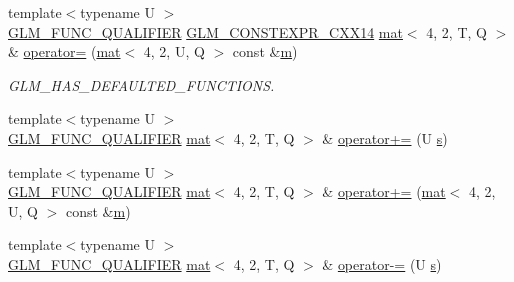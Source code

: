 \begin{DoxyCompactItemize}
\item 
{\footnotesize template$<$typename U $>$ }\\\mbox{\hyperlink{setup_8hpp_a33fdea6f91c5f834105f7415e2a64407}{G\+L\+M\+\_\+\+F\+U\+N\+C\+\_\+\+Q\+U\+A\+L\+I\+F\+I\+ER}} \mbox{\hyperlink{setup_8hpp_a4dd12abf5e1164bc57f3a34671d03844}{G\+L\+M\+\_\+\+C\+O\+N\+S\+T\+E\+X\+P\+R\+\_\+\+C\+X\+X14}} \mbox{\hyperlink{structglm_1_1mat}{mat}}$<$ 4, 2, T, Q $>$ \& \mbox{\hyperlink{structglm_1_1mat_3_014_00_012_00_01_t_00_01_q_01_4_a5a19a58d4bc0772518b210e63aa86e7f}{operator=}} (\mbox{\hyperlink{structglm_1_1mat}{mat}}$<$ 4, 2, U, Q $>$ const \&\mbox{\hyperlink{_s_d_l__opengl__glext_8h_af593500c283bf1a787a6f947f503a5c2}{m}})
\begin{DoxyCompactList}\small\item\em G\+L\+M\+\_\+\+H\+A\+S\+\_\+\+D\+E\+F\+A\+U\+L\+T\+E\+D\+\_\+\+F\+U\+N\+C\+T\+I\+O\+NS. \end{DoxyCompactList}\item 
{\footnotesize template$<$typename U $>$ }\\\mbox{\hyperlink{setup_8hpp_a33fdea6f91c5f834105f7415e2a64407}{G\+L\+M\+\_\+\+F\+U\+N\+C\+\_\+\+Q\+U\+A\+L\+I\+F\+I\+ER}} \mbox{\hyperlink{structglm_1_1mat}{mat}}$<$ 4, 2, T, Q $>$ \& \mbox{\hyperlink{structglm_1_1mat_3_014_00_012_00_01_t_00_01_q_01_4_adbbf9501dbbf80e25bb46facadfbc924}{operator+=}} (U \mbox{\hyperlink{_s_d_l__opengl_8h_a4af680a6c683f88ed67b76f207f2e6e4}{s}})
\item 
{\footnotesize template$<$typename U $>$ }\\\mbox{\hyperlink{setup_8hpp_a33fdea6f91c5f834105f7415e2a64407}{G\+L\+M\+\_\+\+F\+U\+N\+C\+\_\+\+Q\+U\+A\+L\+I\+F\+I\+ER}} \mbox{\hyperlink{structglm_1_1mat}{mat}}$<$ 4, 2, T, Q $>$ \& \mbox{\hyperlink{structglm_1_1mat_3_014_00_012_00_01_t_00_01_q_01_4_a3a85d5dbf4a5202ffc6ddaeb8e8d557e}{operator+=}} (\mbox{\hyperlink{structglm_1_1mat}{mat}}$<$ 4, 2, U, Q $>$ const \&\mbox{\hyperlink{_s_d_l__opengl__glext_8h_af593500c283bf1a787a6f947f503a5c2}{m}})
\item 
{\footnotesize template$<$typename U $>$ }\\\mbox{\hyperlink{setup_8hpp_a33fdea6f91c5f834105f7415e2a64407}{G\+L\+M\+\_\+\+F\+U\+N\+C\+\_\+\+Q\+U\+A\+L\+I\+F\+I\+ER}} \mbox{\hyperlink{structglm_1_1mat}{mat}}$<$ 4, 2, T, Q $>$ \& \mbox{\hyperlink{structglm_1_1mat_3_014_00_012_00_01_t_00_01_q_01_4_ab0e7145b2fcb5576fe85581a2d6c0253}{operator-\/=}} (U \mbox{\hyperlink{_s_d_l__opengl_8h_a4af680a6c683f88ed67b76f207f2e6e4}{s}})
\item 

\end{DoxyCompactItemize}

